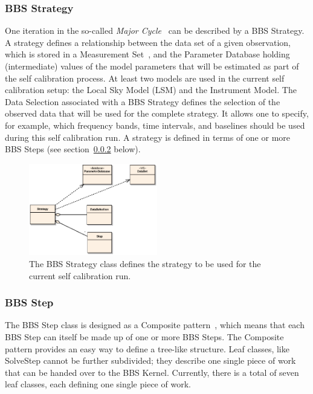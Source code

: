 \documentclass[10pt]{lofar}
\begin{document}
\subsubsection{BBS Strategy}
\label{subsubsec:design-strategy}
One iteration in the so-called \emph{Major
Cycle}~\cite[sec.~4.1]{LOFAR-ASTRON-SDD-050} can be described by a BBS
Strategy. A strategy defines a relationship between the data set of a given
observation, which is stored in a Measurement Set~\cite{aips++note229}, and
the Parameter Database holding (intermediate) values of the model parameters
that will be estimated as part of the self calibration process. At least two
models are used in the current self calibration setup: the Local Sky Model
(LSM) and the Instrument Model. The Data Selection associated with a BBS
Strategy defines the selection of the observed data that will be used for the
complete strategy. It allows one to specify, for example, which frequency bands,
time intervals, and baselines should be used during this self calibration run. A
strategy is defined in terms of one or more BBS Steps (see
section~\ref{subsubsec:design-step} below).

\begin{figure}[!ht]
\centering
\includegraphics[width=0.5\textwidth]{images/bbs-strategy-class-diagram}
\caption{The BBS Strategy class defines the strategy to be used for the
current self calibration run.}
\label{fig:bbsstrategy}
\end{figure}

\subsubsection{BBS Step}
\label{subsubsec:design-step}
The BBS Step class is designed as a Composite pattern~\cite{Gamma1995}, which
means that each BBS Step can itself be made up of one or more BBS Steps. The
Composite pattern provides an easy way to define a tree-like structure. Leaf
classes, like SolveStep cannot be further subdivided; they describe one single
piece of work that can be handed over to the BBS Kernel. Currently, there is a
total of seven leaf classes, each defining one single piece of work.
\end{document}
